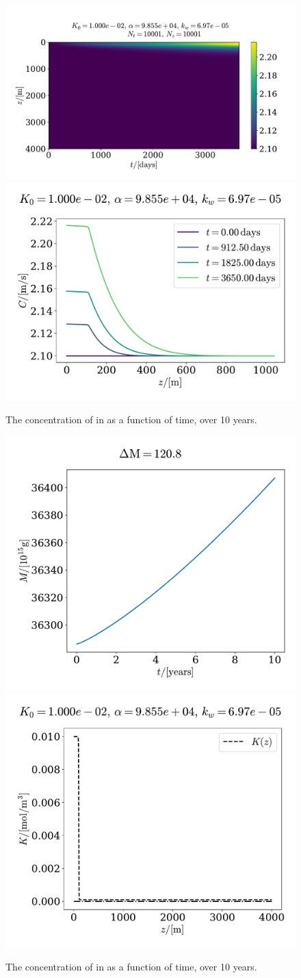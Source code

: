 \documentclass{article}
\begin{document}
    \begin{figure}[H]
        \centering
        \includegraphics[width=.56\textwidth]{../plots/prob3}
        \includegraphics[width=.43\textwidth]{../plots/prob3_i}
        \caption{The concentration of  in as a function of time, over 10 years.}
        \label{prob3}
    \end{figure}

    \begin{figure}[H]
        \centering
        \includegraphics[width=.45\textwidth]{../plots/prob3_M}
        \includegraphics[width=.45\textwidth]{../plots/prob3_K}
        \caption{The concentration of  in as a function of time, over 10 years.}
        \label{prob3 mass}
    \end{figure}

    \printbibliography
\end{document}
